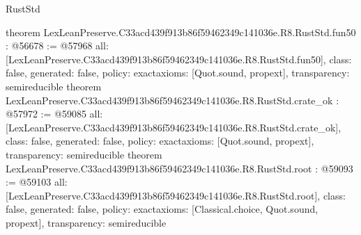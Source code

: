 \begin{lexlean}{RustStd}
\begin{coremodule}
{}
theorem LexLeanPreserve.C33acd439f913b86f59462349c141036e.R8.RustStd.fun50 : @56678 := @57968 {
  all: [LexLeanPreserve.C33acd439f913b86f59462349c141036e.R8.RustStd.fun50],
  class: false,
  generated: false,
  policy: exact{axioms: [Quot.sound, propext]},
  transparency: semireducible
}
theorem LexLeanPreserve.C33acd439f913b86f59462349c141036e.R8.RustStd.crate_ok : @57972 := @59085 {
  all: [LexLeanPreserve.C33acd439f913b86f59462349c141036e.R8.RustStd.crate_ok],
  class: false,
  generated: false,
  policy: exact{axioms: [Quot.sound, propext]},
  transparency: semireducible
}
theorem LexLeanPreserve.C33acd439f913b86f59462349c141036e.R8.RustStd.root : @59093 := @59103 {
  all: [LexLeanPreserve.C33acd439f913b86f59462349c141036e.R8.RustStd.root],
  class: false,
  generated: false,
  policy: exact{axioms: [Classical.choice, Quot.sound, propext]},
  transparency: semireducible
}


\end{coremodule}
\end{lexlean}
